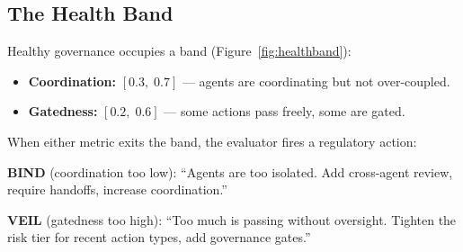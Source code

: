 \documentclass[sigconf,nonacm]{acmart}
\begin{document}
\subsection{The Health Band}

Healthy governance occupies a band (Figure~\ref{fig:healthband}):

\begin{itemize}[leftmargin=*]
  \item \textbf{Coordination:} $[0.3,\; 0.7]$ --- agents are coordinating
    but not over-coupled.
  \item \textbf{Gatedness:} $[0.2,\; 0.6]$ --- some actions pass freely,
    some are gated.
\end{itemize}

When either metric exits the band, the evaluator fires a regulatory action:

\textbf{BIND} (coordination too low): ``Agents are too isolated. Add
cross-agent review, require handoffs, increase coordination.''

\textbf{VEIL} (gatedness too high): ``Too much is passing without
oversight. Tighten the risk tier for recent action types, add governance
gates.''
\end{document}
